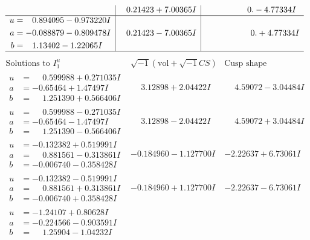 \documentclass[1p]{elsarticle_modified}
\theoremstyle{definition}
\newcommand{\I}{\sqrt{-1}}
\begin{document}
$$\begin{array}{c|c|c}
 & \phantom{-}0.21423 + 7.00365 I & \phantom{-0.000000 } 0. - 4.77334 I \\ \hline\begin{aligned}
u &= \phantom{-}0.894095 - 0.973220 I \\
a &= -0.088879 - 0.809478 I \\
b &= \phantom{-}1.13402 - 1.22065 I\end{aligned}
 & \phantom{-}0.21423 - 7.00365 I & \phantom{-0.000000 -}0. + 4.77334 I\\
 \hline 
 \end{array}$$\newpage$$\begin{array}{c|c|c}  
\text{Solutions to }I^u_{1}& \I (\text{vol} + \sqrt{-1}CS) & \text{Cusp shape}\\
 \hline 
\begin{aligned}
u &= \phantom{-}0.599988 + 0.271035 I \\
a &= -0.65464 + 1.47497 I \\
b &= \phantom{-}1.251390 + 0.566406 I\end{aligned}
 & \phantom{-}3.12898 + 2.04422 I & \phantom{-}4.59072 - 3.04484 I \\ \hline\begin{aligned}
u &= \phantom{-}0.599988 - 0.271035 I \\
a &= -0.65464 - 1.47497 I \\
b &= \phantom{-}1.251390 - 0.566406 I\end{aligned}
 & \phantom{-}3.12898 - 2.04422 I & \phantom{-}4.59072 + 3.04484 I \\ \hline\begin{aligned}
u &= -0.132382 + 0.519991 I \\
a &= \phantom{-}0.881561 - 0.313861 I \\
b &= -0.006740 - 0.358428 I\end{aligned}
 & -0.184960 - 1.127700 I & -2.22637 + 6.73061 I \\ \hline\begin{aligned}
u &= -0.132382 - 0.519991 I \\
a &= \phantom{-}0.881561 + 0.313861 I \\
b &= -0.006740 + 0.358428 I\end{aligned}
 & -0.184960 + 1.127700 I & -2.22637 - 6.73061 I \\ \hline\begin{aligned}
u &= -1.24107 + 0.80628 I \\
a &= -0.224566 - 0.903591 I \\
b &= \phantom{-}1.25904 - 1.04232 I\end{aligned}

\end{array}$$
\end{document}
